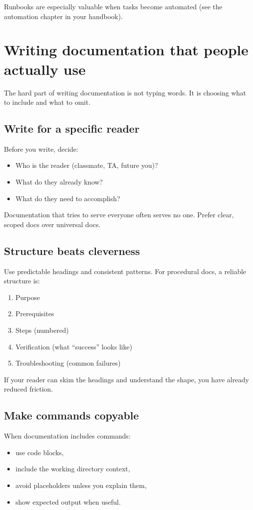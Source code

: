 Runbooks are especially valuable when tasks become automated (see the automation chapter in your handbook).

\section{Writing documentation that people actually use}
The hard part of writing documentation is not typing words. It is choosing what to include and what to omit.

\subsection{Write for a specific reader}
Before you write, decide:
\begin{itemize}[noitemsep]
  \item Who is the reader (classmate, TA, future you)?
  \item What do they already know?
  \item What do they need to accomplish?
\end{itemize}

Documentation that tries to serve everyone often serves no one. Prefer clear, scoped docs over universal docs.

\subsection{Structure beats cleverness}
Use predictable headings and consistent patterns. For procedural docs, a reliable structure is:
\begin{enumerate}[noitemsep]
  \item Purpose
  \item Prerequisites
  \item Steps (numbered)
  \item Verification (what “success” looks like)
  \item Troubleshooting (common failures)
\end{enumerate}

If your reader can skim the headings and understand the shape, you have already reduced friction.

\subsection{Make commands copyable}
When documentation includes commands:
\begin{itemize}[noitemsep]
  \item use code blocks,
  \item include the working directory context,
  \item avoid placeholders unless you explain them,
  \item show expected output when useful.
\end{itemize}

